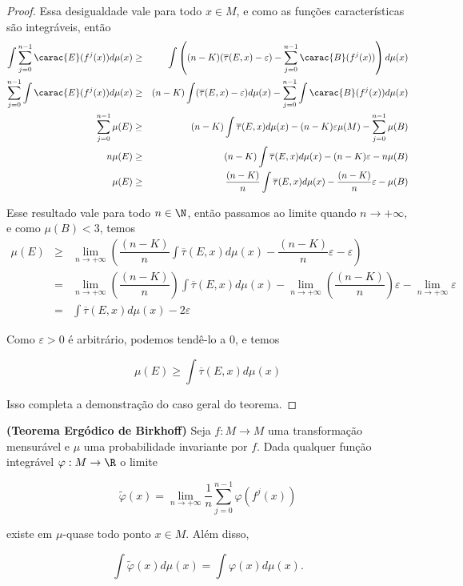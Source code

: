 \begin{proof}
Essa desigualdade vale para todo $x\in M$, e como as funções características são integráveis, então
\begin{eqnarray*}
\int\sum_{j=0}^{n-1}\carac{E}(f^j(x))d\mu(x) & \geq & \int\left((n-K)(\overline{\tau}(E,x)-\varepsilon)-\sum_{j=0}^{n-1}\carac{B}(f^j(x))\right)d\mu(x)\\
\sum_{j=0}^{n-1}\int\carac{E}(f^j(x))d\mu(x) & \geq & (n-K)\int(\overline{\tau}(E,x)-\varepsilon)d\mu(x)-\sum_{j=0}^{n-1}\int\carac{B}(f^j(x))d\mu(x)\\
\sum_{j=0}^{n-1}\mu(E) & \geq & (n-K)\int\overline{\tau}(E,x)d\mu(x)-(n-K)\varepsilon\mu(M)-\sum_{j=0}^{n-1}\mu(B)\\
n\mu(E) & \geq & (n-K)\int\overline{\tau}(E,x)d\mu(x)-(n-K)\varepsilon-n\mu(B)\\
\mu(E) & \geq & \dfrac{(n-K)}{n}\int\overline{\tau}(E,x)d\mu(x)-\dfrac{(n-K)}{n}\varepsilon-\mu(B)
\end{eqnarray*}\vspace{0.1cm}

Esse resultado vale para todo $n\in\N$, então passamos ao limite quando $n\to+\infty$, e como $\mu(B)<3$, temos
\begin{eqnarray*}
\mu(E) & \geq & \lim_{n\to+\infty}\left(\dfrac{(n-K)}{n}\int\overline{\tau}(E,x)d\mu(x)-\dfrac{(n-K)}{n}\varepsilon-\varepsilon\right)\\
& = & \lim_{n\to+\infty}\left(\dfrac{(n-K)}{n}\right)\int\overline{\tau}(E,x)d\mu(x)-\lim_{n\to+\infty}\left(\dfrac{(n-K)}{n}\right)\varepsilon-\lim_{n\to+\infty}\varepsilon\\
& = & \int\overline{\tau}(E,x)d\mu(x)-2\varepsilon
\end{eqnarray*}\vspace{0.1cm}

Como $\varepsilon>0$ é arbitrário, podemos  tendê-lo a 0, e temos

\begin{equation*}
\mu(E)\geq\int\overline{\tau}(E,x)d\mu(x)
\end{equation*}\vspace{0.1cm}

Isso completa a demonstração do caso geral do teorema.

\end{proof}

\begin{teorema}\label{teb}

{\bf (Teorema Ergódico de Birkhoff)} Seja $f : M \to M$ uma transformação mensurável e $\mu$ uma probabilidade invariante por $f$. Dada qualquer função integrável $\varphi : M \to \R$ o limite 

\begin{equation*}
\tilde{\varphi}(x) = \lim_{n\to+\infty}\dfrac{1}{n}\sum_{j=0}^{n-1}{\varphi(f^j(x))}
\end{equation*}

existe em $\mu$-quase todo ponto $x\in M$. Além disso,

\begin{equation*}
\int{\tilde{\varphi}(x)d\mu(x)}=\int{\varphi(x)d\mu(x)}.
\end{equation*}

\end{teorema}

